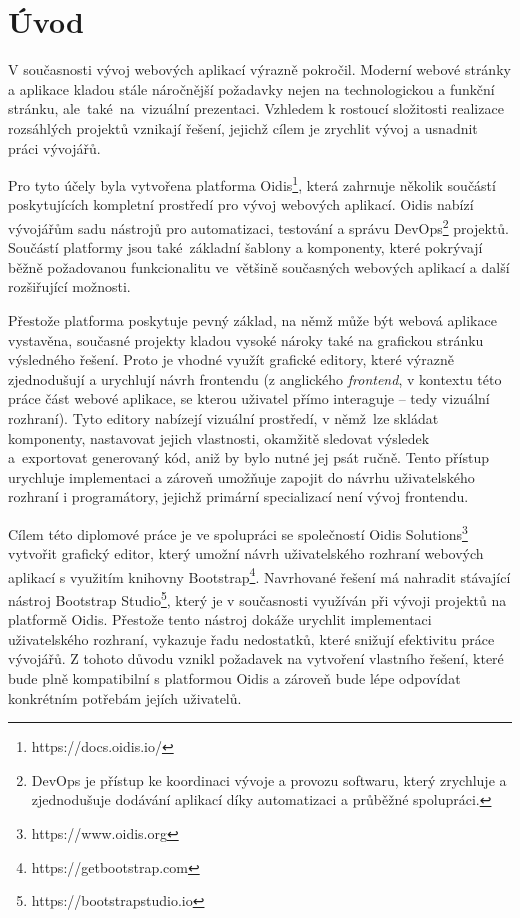 
%

\chapter{Úvod}
V současnosti vývoj webových aplikací výrazně pokročil. Moderní webové stránky a aplikace kladou stále náročnější požadavky nejen na technologickou a funkční stránku, ale~také~na~vizuální prezentaci. Vzhledem k rostoucí složitosti realizace rozsáhlých projektů vznikají řešení, jejichž cílem je zrychlit vývoj a usnadnit práci vývojářů.

Pro tyto účely byla vytvořena platforma Oidis\footnote{https://docs.oidis.io/}, která zahrnuje několik součástí poskytujících kompletní prostředí pro vývoj webových aplikací. Oidis nabízí vývojářům sadu nástrojů pro automatizaci, testování a správu DevOps\footnote{DevOps je přístup ke koordinaci vývoje a provozu softwaru, který zrychluje a zjednodušuje dodávání aplikací díky automatizaci a průběžné spolupráci.} projektů. Součástí platformy jsou také~základní šablony a komponenty, které pokrývají běžně požadovanou funkcionalitu ve~většině současných webových aplikací a další rozšiřující možnosti.

Přestože platforma poskytuje pevný základ, na němž může být webová aplikace vystavěna, současné projekty kladou vysoké nároky také na grafickou stránku výsledného řešení. Proto je vhodné využít grafické editory, které výrazně zjednodušují a urychlují návrh frontendu (z anglického \textit{frontend}, v kontextu této práce část webové aplikace, se kterou uživatel přímo interaguje -- tedy vizuální rozhraní). Tyto editory nabízejí vizuální prostředí, v němž~lze skládat komponenty, nastavovat jejich vlastnosti, okamžitě sledovat výsledek a~exportovat generovaný kód, aniž by bylo nutné jej psát ručně. Tento přístup urychluje implementaci a zároveň umožňuje zapojit do návrhu uživatelského rozhraní i programátory, jejichž primární specializací není vývoj frontendu.

Cílem této diplomové práce je ve spolupráci se společností Oidis Solutions\footnote{https://www.oidis.org} vytvořit grafický editor, který umožní návrh uživatelského rozhraní webových aplikací s využitím knihovny Bootstrap\footnote{https://getbootstrap.com}. Navrhované řešení má nahradit stávající nástroj Bootstrap Studio\footnote{https://bootstrapstudio.io}, který je v současnosti využíván při vývoji projektů na platformě Oidis. Přestože tento nástroj dokáže urychlit implementaci uživatelského rozhraní, vykazuje řadu nedostatků, které snižují efektivitu práce vývojářů. Z tohoto důvodu vznikl požadavek na vytvoření vlastního řešení, které bude plně kompatibilní s platformou Oidis a zároveň bude lépe odpovídat konkrétním potřebám jejích uživatelů.

